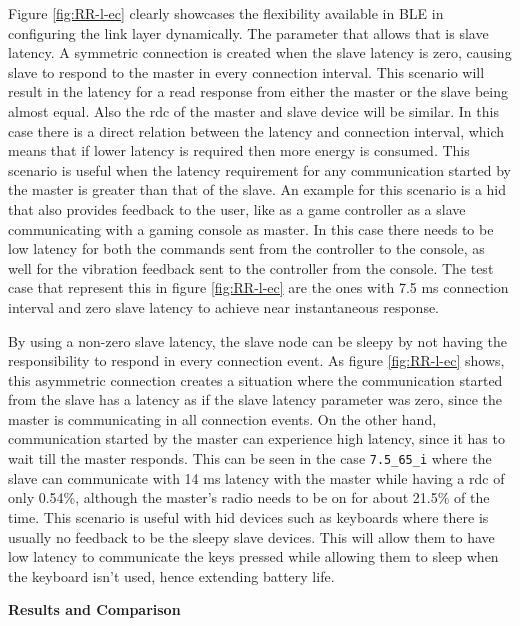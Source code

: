 Figure \ref{fig:RR-l-ec} clearly showcases the flexibility available in BLE in configuring the link layer dynamically. The parameter that allows that is slave latency. A symmetric connection is created when the slave latency is zero, causing slave to respond to the master in every connection interval. This scenario will result in the latency for a read response from either the master or the slave being almost equal. Also the \gls{rdc} of the master and slave device will be similar. In this case there is a direct relation between the latency and connection interval, which means that if lower latency is required then more energy is consumed. This scenario is useful when the latency requirement for any communication started by the master is greater than that of the slave. An example for this scenario is a \gls{hid} that also provides feedback to the user, like as a game controller as a slave communicating with a gaming console as master. In this case there needs to be low latency for both the commands sent from the controller to the console, as well for the vibration feedback sent to the controller from the console. The test case that represent this in figure \ref{fig:RR-l-ec} are the ones with 7.5 ms connection interval and zero slave latency to achieve near instantaneous response.

By using a non-zero slave latency, the slave node can be sleepy by not having the responsibility to respond in every connection event. As figure \ref{fig:RR-l-ec} shows, this asymmetric connection creates a situation where the communication started from the slave has a latency as if the slave latency parameter was zero, since the master is communicating in all connection events. On the other hand, communication started by the master can experience high latency, since it has to wait till the master responds. This can be seen in the case \texttt{7.5\_65\_i} where the slave can communicate with 14 ms latency with the master while having a \gls{rdc} of only 0.54\%, although the master's radio needs to be on for about 21.5\% of the time. This scenario is useful with \gls{hid} devices such as keyboards where there is usually no feedback to be the sleepy slave devices. This will allow them to have low latency to communicate the keys pressed while allowing them to sleep when the keyboard isn't used, hence extending battery life.

\vspace{7pt}
\noindent\textbf{Results and Comparison}

